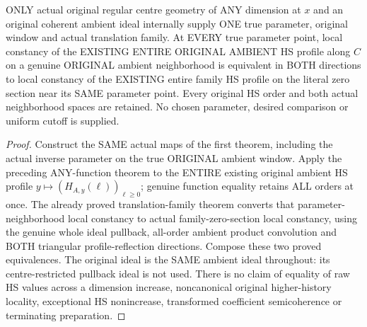 \begin{theorem}
\label{hir:original-regular-centre-entire-ambient-hs-family-germ}
\leanok
ONLY actual original regular centre geometry of ANY dimension at $x$ and
an original coherent ambient ideal internally supply ONE true parameter,
original window and actual translation family. At EVERY true parameter
point, local constancy of the EXISTING ENTIRE ORIGINAL AMBIENT HS profile
along $C$ on a genuine ORIGINAL ambient neighborhood is equivalent in BOTH
directions to local constancy of the EXISTING entire family HS profile on
the literal zero section near its SAME parameter point. Every original HS
order and both actual neighborhood spaces are retained. No chosen
parameter, desired comparison or uniform cutoff is supplied.
\end{theorem}
\begin{proof}
Construct the SAME actual maps of the first theorem, including the actual
inverse parameter on the true ORIGINAL ambient window. Apply the preceding
ANY-function theorem to the ENTIRE existing original ambient HS profile
$y\mapsto(H_{A,y}(\ell))_{\ell\ge0}$; genuine function equality retains ALL
orders at once. The already proved translation-family theorem converts
that parameter-neighborhood local constancy to actual family-zero-section
local constancy, using the genuine whole ideal pullback, all-order ambient
product convolution and BOTH triangular profile-reflection directions.
Compose these two proved equivalences. The original ideal is the SAME
ambient ideal throughout: its centre-restricted pullback ideal is not used.
There is no claim of equality of raw HS values across a dimension increase,
noncanonical original higher-history locality, exceptional HS nonincrease,
transformed coefficient semicoherence or terminating preparation.
\end{proof}
